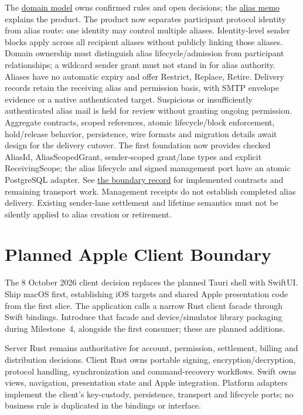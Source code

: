 \documentclass[11pt]{article}
\begin{document}
The \href{DOMAIN_MODEL.md}{domain model} owns confirmed rules and open decisions;
the \href{cs_mail_aliases_and_express_lanes.tex}{alias memo} explains the product.
The product now separates participant protocol identity from alias route: one
identity may control multiple aliases. Identity-level sender blocks apply across
all recipient aliases without publicly linking those aliases. Domain ownership
must distinguish alias lifecycle/admission from participant relationships; a
wildcard sender grant must not stand in for alias authority. Aliases have
no automatic expiry and offer Restrict, Replace, Retire. Delivery records retain
the receiving alias and permission basis, with SMTP envelope evidence or a native
authenticated target. Suspicious or insufficiently authenticated alias
mail is held for review without granting ongoing permission.
Aggregate contracts, scoped references, atomic lifecycle/block enforcement,
hold/release behavior, persistence, wire formats and migration details await
design for the delivery cutover. The first foundation now provides checked
AliasId, AliasScopedGrant, sender-scoped grant/lane types and explicit ReceivingScope;
the alias lifecycle and signed management port have an atomic PostgreSQL adapter.
See \href{docs/application-persistence-boundaries.md}{the boundary record} for
implemented contracts and remaining transport work. Management receipts do not
establish completed alias delivery. Existing sender-lane settlement and lifetime semantics must not
be silently applied to alias creation or retirement.

\section{Planned Apple Client Boundary}

The 8 October 2026 client decision replaces the planned Tauri shell with SwiftUI.
Ship macOS first, establishing iOS targets and shared Apple presentation code from
the first slice. The application calls a narrow Rust client facade through Swift
bindings. Introduce that facade and device/simulator library packaging during
Milestone~4, alongside the first consumer; these are planned additions.

Server Rust remains authoritative for account, permission, settlement, billing and
distribution decisions. Client Rust owns portable signing, encryption/decryption,
protocol handling, synchronization and command-recovery workflows. Swift owns
views, navigation, presentation state and Apple integration. Platform adapters
implement the client's key-custody, persistence, transport and lifecycle ports;
no business rule is duplicated in the bindings or interface.
\end{document}
